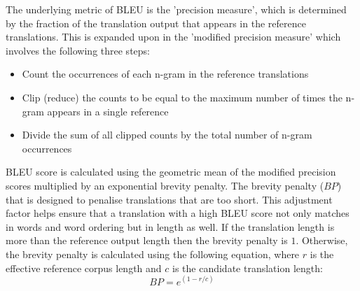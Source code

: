 




The underlying metric of \acrshort{BLEU} is the 'precision measure', which is determined by the fraction of the translation output that appears in the reference translations. This is expanded upon in the 'modified precision measure' which involves the following three steps:
\begin{itemize}
    \item Count the occurrences of each n-gram in the reference translations
    \item Clip (reduce) the counts to be equal to the maximum number of times the n-gram appears in a single reference
    \item Divide the sum of all clipped counts by the total number of n-gram occurrences
\end{itemize}

\acrshort{BLEU} score is calculated using the geometric mean of the modified precision scores multiplied by an exponential brevity penalty.
The brevity penalty ($BP$) that is designed to penalise translations that are too short. This adjustment factor helps ensure that a translation with a high \acrshort{BLEU} score not only matches in words and word ordering but in length as well.
If the translation length is more than the reference output length then the brevity penalty is $1$. Otherwise, the brevity penalty is calculated using the following equation, where $r$ is the effective reference corpus length and $c$ is the candidate translation length:
\begin{equation}
    BP = e^{(1-r/c)}
\end{equation}

